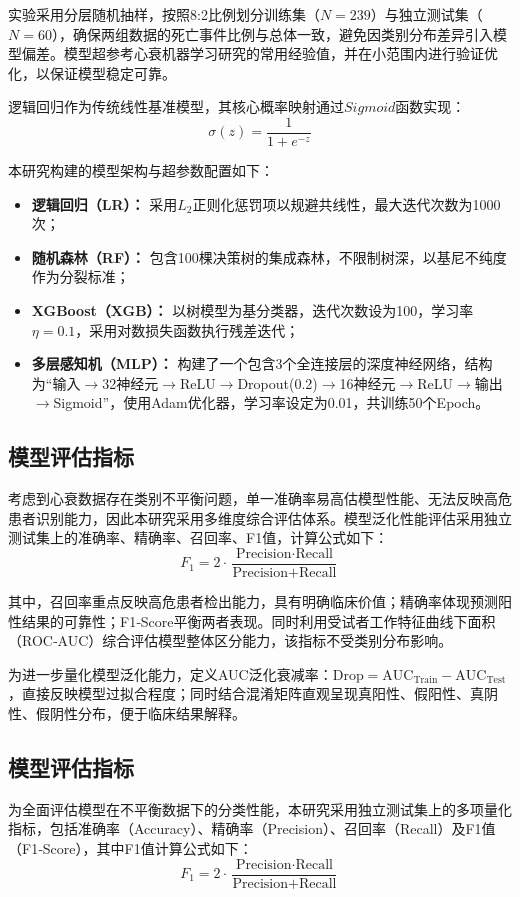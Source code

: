 \documentclass[11pt,a4paper]{ctexart} %
\begin{document}
实验采用分层随机抽样，按照8:2比例划分训练集（$N=239$）与独立测试集（$N=60$），确保两组数据的死亡事件比例与总体一致，避免因类别分布差异引入模型偏差。模型超参考心衰机器学习研究的常用经验值，并在小范围内进行验证优化，以保证模型稳定可靠。

逻辑回归作为传统线性基准模型，其核心概率映射通过$Sigmoid$函数实现：
\begin{equation}
    \sigma(z) = \frac{1}{1+e^{-z}}
\end{equation}

本研究构建的模型架构与超参数配置如下：
\begin{itemize}
    \item \textbf{逻辑回归（LR）：} 采用$L_2$正则化惩罚项以规避共线性，最大迭代次数为1000次；
    \item \textbf{随机森林（RF）：} 包含100棵决策树的集成森林，不限制树深，以基尼不纯度作为分裂标准；
    \item \textbf{XGBoost（XGB）：} 以树模型为基分类器，迭代次数设为100，学习率$\eta=0.1$，采用对数损失函数执行残差迭代；
    \item \textbf{多层感知机（MLP）：} 构建了一个包含3个全连接层的深度神经网络，结构为“输入$\to$32神经元$\to$ReLU$\to$Dropout(0.2)$\to$16神经元$\to$ReLU$\to$输出$\to$Sigmoid”，使用Adam优化器，学习率设定为0.01，共训练50个Epoch。
\end{itemize}

\subsection{模型评估指标}
考虑到心衰数据存在类别不平衡问题，单一准确率易高估模型性能、无法反映高危患者识别能力，因此本研究采用多维度综合评估体系。模型泛化性能评估采用独立测试集上的准确率、精确率、召回率、F1值，计算公式如下：
\begin{equation}
    F_1 = 2 \cdot \frac{\text{Precision} \cdot \text{Recall}}{\text{Precision} + \text{Recall}}
\end{equation}

其中，召回率重点反映高危患者检出能力，具有明确临床价值；精确率体现预测阳性结果的可靠性；F1‑Score平衡两者表现。同时利用受试者工作特征曲线下面积（ROC‑AUC）综合评估模型整体区分能力，该指标不受类别分布影响。

为进一步量化模型泛化能力，定义AUC泛化衰减率：$\text{Drop} = \text{AUC}_{\text{Train}} - \text{AUC}_{\text{Test}}$，直接反映模型过拟合程度；同时结合混淆矩阵直观呈现真阳性、假阳性、真阴性、假阴性分布，便于临床结果解释。

\subsection{模型评估指标}
为全面评估模型在不平衡数据下的分类性能，本研究采用独立测试集上的多项量化指标，包括准确率（Accuracy）、精确率（Precision）、召回率（Recall）及F1值（F1‑Score），其中F1值计算公式如下：
\begin{equation}
    F_1 = 2 \cdot \frac{\text{Precision} \cdot \text{Recall}}{\text{Precision} + \text{Recall}}
\end{equation}
\end{document}
